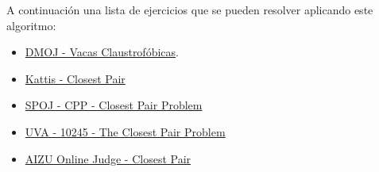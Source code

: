 A continuación una lista de ejercicios que se pueden resolver aplicando este algoritmo:

\begin{itemize}
	\item \href{https://dmoj.uclv.edu.cu/problem/claust} {DMOJ - Vacas Claustrofóbicas}.
	\item \href{https://open.kattis.com/problems/closestpair2} {Kattis - Closest Pair}
	\item \href{https://www.spoj.com/problems/CPP/}{SPOJ - CPP - Closest Pair Problem}
	\item \href{https://onlinejudge.org/index.php?option=com_onlinejudge&Itemid=8&category=24&page=show_problem&problem=1186}{UVA - 10245 - The Closest Pair Problem}
	\item \href{https://judge.u-aizu.ac.jp/onlinejudge/description.jsp?id=CGL_5_A&lang=en}{AIZU Online Judge - Closest Pair}
\end{itemize}